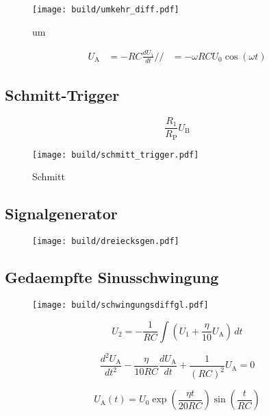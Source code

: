 \begin{figure}[h]
		\centering
		\texttt{[image: build/umkehr\_diff.pdf]}
		\caption{um}
		\label{fig:}
\end{figure}

\begin{align}
		U_\text{A} &= - RC \frac{dU_1}{dt} //
				   &= - \omega R C U_0 \cos(\omega t)
\end{align}

\subsection{Schmitt-Trigger}%
\label{sub:schmitt_trigger}

\begin{equation}
		\label{eq:schmitt}
		\frac{R_1}{R_\text{P}} U_\text{B}
\end{equation}

\begin{figure}[h]
		\centering
		\texttt{[image: build/schmitt\_trigger.pdf]}
		\caption{Schmitt}
		\label{fig:}
\end{figure}

\subsection{Signalgenerator}%
\label{sub:signalgenerator}

\begin{figure}[h]
		\centering
		\texttt{[image: build/dreiecksgen.pdf]}
		\caption{}
		\label{fig:}
\end{figure}

\subsection{Gedaempfte Sinusschwingung}%
\label{sub:gedaempfte_sinusschwingung}

\begin{figure}[h]
		\centering
		\texttt{[image: build/schwingungsdiffgl.pdf]}
		\caption{}
		\label{fig:}
\end{figure}

\begin{equation}
		\label{eq:ov2}
		U_2 = - \frac{1}{RC} \int \left( U_1 + \frac{\eta}{10} U_\text{A} \right) \, dt
\end{equation}

\begin{equation}
		\label{eq:schwingung_diff}
		\frac{d^2 U_\text{A}}{dt^2} - \frac{\eta}{10 R C} \frac{d
		U_\text{A}}{dt} + \frac{1}{(RC)^2} U_\text{A} = 0
\end{equation}


\begin{equation}
		U_\text{A}(t) = U_0 \exp \left( \frac{\eta t}{20 RC} \right) 
		\sin \left(\frac{t}{RC}\right)
\end{equation}
